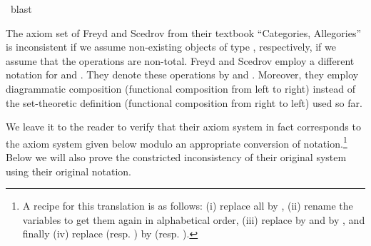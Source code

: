 \begin{isabellebody}
\ blast%
\endisatagproof
{\isafoldproof}%
%
\isadelimproof
%
\endisadelimproof
%
\isamarkuptrue%
%
\begin{isamarkuptext}%
The axiom set of Freyd and Scedrov from their textbook
 ``Categories, Allegories'' \cite{FreydScedrov90} is inconsistent if we assume 
  non-existing objects of type , respectively, if we assume that the operations are 
  non-total.  Freyd and Scedrov employ a different notation for 
   and . They denote these operations by  
  and . Moreover, they employ diagrammatic composition  
  (functional composition from left to right) instead of the set-theoretic 
  definition  (functional composition from right to left) used so far.
 
  We leave it to the reader to verify that their axiom system in fact corresponds to the 
  axiom system given below modulo an appropriate conversion of notation.\footnote{A recipe for 
  this translation is as follows: (i) replace all  by , 
(ii) rename the variables to get them again in alphabetical order,
(iii) replace \isa{{\isasymphi}{\isasymbox}} by  and \isa{{\isasymbox}{\isasymphi}}  by , and finally
(iv) replace  (resp. ) 
   by  (resp. ).}
  Below we will also prove the constricted inconsistency of their original system using their original notation.


\end{isamarkuptext}
\end{isabellebody}
